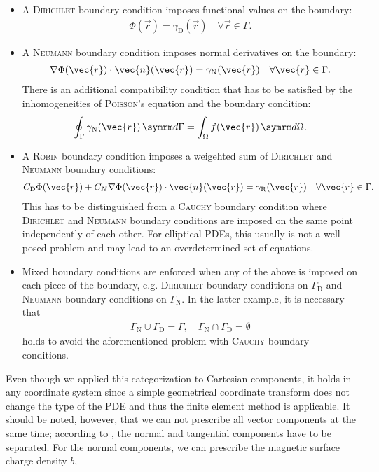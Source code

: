 \begin{itemize}
\item A \textsc{Dirichlet} boundary condition imposes functional values on the boundary:
  \begin{gather*}
    \Phi (\vec{r}) = \gamma_{\text{D}} (\vec{r}) \quad \forall \vec{r} \in \Gamma.
  \end{gather*}
\item A \textsc{Neumann} boundary condition imposes normal derivatives on the boundary:
  \begin{gather*}
    \grad \Phi (\vec{r}) \cdot \vec{n} (\vec{r}) = \gamma_{\text{N}} (\vec{r}) \quad \forall \vec{r} \in \Gamma.
  \end{gather*}
  There is an additional compatibility condition that has to be satisfied by the inhomogeneities of \textsc{Poisson}'s equation and the boundary condition:
  \begin{gather*}
    \oint_{\Gamma} \gamma_{\text{N}} (\vec{r}) \, \diff \Gamma = \int_{\Omega} f (\vec{r}) \, \diff \Omega.
  \end{gather*}
\item A \textsc{Robin} boundary condition imposes a weigehted sum of \textsc{Dirichlet} and \textsc{Neumann} boundary conditions:
  \begin{gather*}
    C_{\text{D}} \Phi (\vec{r}) + C_{N} \grad \Phi (\vec{r}) \cdot \vec{n} (\vec{r}) = \gamma_{\text{R}} (\vec{r}) \quad \forall \vec{r} \in \Gamma.
  \end{gather*}
  This has to be distinguished from a \textsc{Cauchy} boundary condition where \textsc{Dirichlet} and \textsc{Neumann} boundary conditions are imposed on the same point independently of each other. For elliptical PDEs, this usually is not a well-posed problem and may lead to an overdetermined set of equations.
\item Mixed boundary conditions are enforced when any of the above is imposed on each piece of the boundary, e.g. \textsc{Dirichlet} boundary conditions on $\Gamma_{\text{D}}$ and \textsc{Neumann} boundary conditions on $\Gamma_{\text{N}}$. In the latter example, it is necessary that
  \begin{gather*}
    \Gamma_{\text{N}} \cup \Gamma_{\text{D}} = \Gamma, \quad \Gamma_{\text{N}} \cap \Gamma_{\text{D}} = \emptyset
  \end{gather*}
  holds to avoid the aforementioned problem with \textsc{Cauchy} boundary conditions.
\end{itemize}
Even though we applied this categorization to Cartesian components, it holds in any coordinate system since a simple geometrical coordinate transform does not change the type of the PDE and thus the finite element method is applicable. It should be noted, however, that we can not prescribe all vector components at the same time; according to \textcite{Biro15}, the normal and tangential components have to be separated. For the normal components, we can prescribe the magnetic surface charge density $b$,

